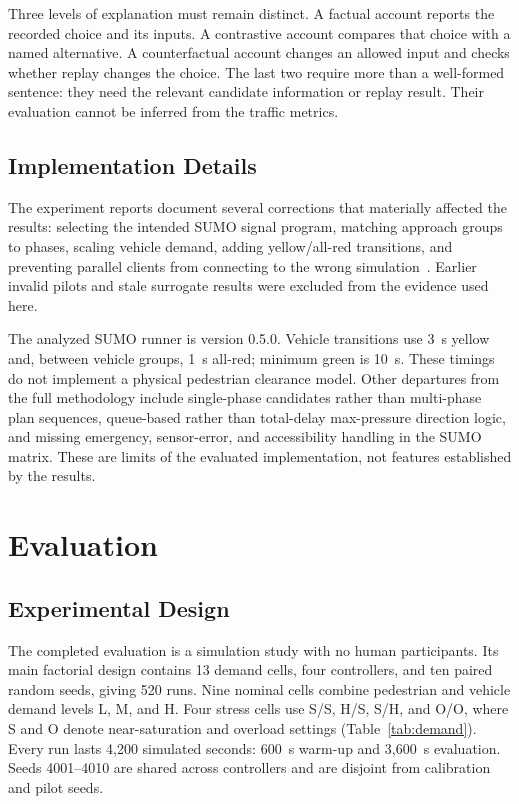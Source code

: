 \documentclass[sigconf]{acmart}
\begin{document}
Three levels of explanation must remain distinct. A factual account
reports the recorded choice and its inputs. A contrastive account
compares that choice with a named alternative. A counterfactual
account changes an allowed input and checks whether replay changes
the choice. The last two require more than a well-formed sentence:
they need the relevant candidate information or replay result.
Their evaluation cannot be inferred from the traffic metrics.

\subsection{Implementation Details}
The experiment reports document several corrections that materially
affected the results: selecting the intended SUMO signal program,
matching approach groups to phases, scaling vehicle demand,
adding yellow/all-red transitions, and preventing parallel clients
from connecting to the wrong simulation~\cite{runreport}. Earlier
invalid pilots and stale surrogate results were excluded from the
evidence used here.

The analyzed SUMO runner is version 0.5.0. Vehicle transitions use
3~s yellow and, between vehicle groups, 1~s all-red; minimum green
is 10~s. These timings do not implement a physical pedestrian
clearance model. Other departures from the full methodology include
single-phase candidates rather than multi-phase plan sequences,
queue-based rather than total-delay max-pressure direction logic,
and missing emergency, sensor-error, and accessibility handling in
the SUMO matrix. These are limits of the evaluated implementation,
not features established by the results.

\section{Evaluation}
\subsection{Experimental Design}
The completed evaluation is a simulation study with no human
participants. Its main factorial design contains 13 demand cells,
four controllers, and ten paired random seeds, giving 520 runs.
Nine nominal cells combine pedestrian and vehicle demand levels
L, M, and H. Four stress cells use S/S, H/S, S/H, and O/O, where
S and O denote near-saturation and overload settings
(Table~\ref{tab:demand}). Every run lasts 4,200 simulated seconds:
600~s warm-up and 3,600~s evaluation. Seeds 4001--4010 are shared
across controllers and are disjoint from calibration and pilot seeds.
\end{document}

